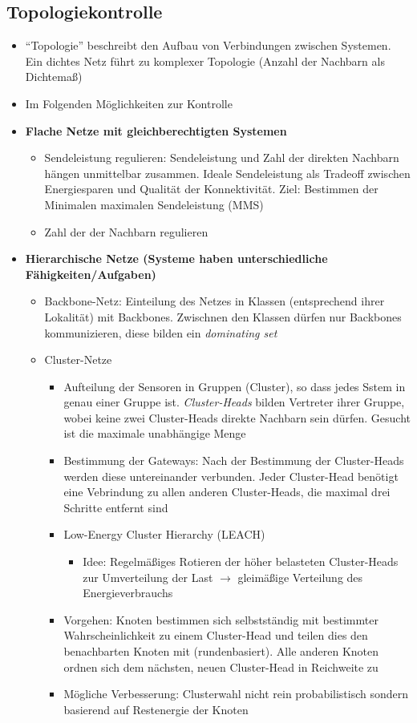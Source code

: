 \subsection{Topologiekontrolle}
\begin{itemize}
	\item "`Topologie"' beschreibt den Aufbau von Verbindungen zwischen Systemen. Ein dichtes Netz führt zu komplexer Topologie (Anzahl der Nachbarn als Dichtemaß)
	\item Im Folgenden Möglichkeiten zur Kontrolle
	\item \textbf{Flache Netze mit gleichberechtigten Systemen}
	\begin{itemize}
		\item Sendeleistung regulieren: Sendeleistung und Zahl der direkten Nachbarn hängen unmittelbar zusammen. Ideale Sendeleistung als Tradeoff zwischen Energiesparen und Qualität der Konnektivität. Ziel: Bestimmen der Minimalen maximalen Sendeleistung (MMS)
		\item Zahl der der Nachbarn regulieren
	\end{itemize}
	\item \textbf{Hierarchische Netze (Systeme haben unterschiedliche Fähigkeiten/Aufgaben)}
	\begin{itemize}
		\item Backbone-Netz: Einteilung des Netzes in Klassen (entsprechend ihrer Lokalität) mit Backbones. Zwischnen den Klassen dürfen nur Backbones kommunizieren, diese bilden ein \textit{dominating set}
		\item Cluster-Netze
		\begin{itemize}
			\item Aufteilung der Sensoren in Gruppen (Cluster), so dass jedes Sstem in genau einer Gruppe ist. \textit{Cluster-Heads} bilden Vertreter ihrer Gruppe, wobei keine zwei Cluster-Heads direkte Nachbarn sein dürfen. Gesucht ist die maximale unabhängige Menge
			\item Bestimmung der Gateways: Nach der Bestimmung der Cluster-Heads werden diese untereinander verbunden. Jeder Cluster-Head benötigt eine Vebrindung zu allen anderen Cluster-Heads, die maximal drei Schritte entfernt sind
			\item Low-Energy Cluster Hierarchy (LEACH)
			\begin{itemize}
				\item Idee: Regelmäßiges Rotieren der höher belasteten Cluster-Heads zur Umverteilung der Last \(\rightarrow\) gleimäßige Verteilung des Energieverbrauchs
			\end{itemize}
			\item Vorgehen: Knoten bestimmen sich selbstständig mit bestimmter Wahrscheinlichkeit zu einem Cluster-Head und teilen dies den benachbarten Knoten mit (rundenbasiert). Alle anderen Knoten ordnen sich dem nächsten, neuen Cluster-Head in Reichweite zu
			\item Mögliche Verbesserung: Clusterwahl nicht rein probabilistisch sondern basierend auf Restenergie der Knoten
		\end{itemize}
	\end{itemize}
\end{itemize}


